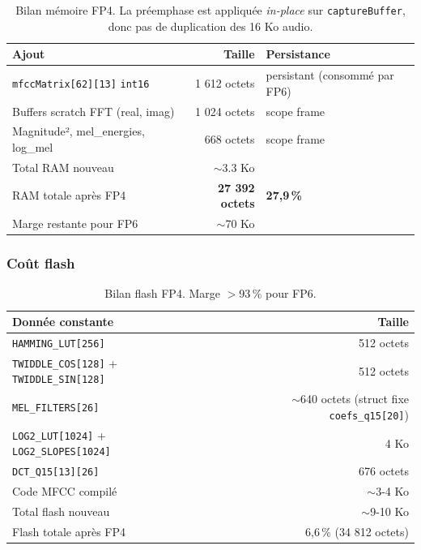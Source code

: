 \begin{table}[H]
\centering
\small
\begin{tabularx}{0.85\linewidth}{@{}l r X@{}}
\toprule
\textbf{Ajout} & \textbf{Taille} & \textbf{Persistance} \\
\midrule
\texttt{mfccMatrix[62][13]} \texttt{int16} & 1 612 octets  & persistant (consommé par FP6) \\
Buffers scratch FFT (real, imag) & 1 024 octets  & scope frame \\
Magnitude², mel\_energies, log\_mel & 668 octets    & scope frame \\
\midrule
Total RAM nouveau & $\sim$3.3 Ko & \\
RAM totale après FP4 & \textbf{27 392 octets} & \textbf{27,9\,\%} \\
Marge restante pour FP6 & $\sim$70 Ko & \\
\bottomrule
\end{tabularx}
\caption{Bilan mémoire FP4. La préemphase est appliquée \emph{in-place} sur \texttt{captureBuffer}, donc pas de duplication des 16 Ko audio.}
\end{table}

\subsubsection{Coût flash}

\begin{table}[H]
\centering
\small
\begin{tabularx}{0.85\linewidth}{@{}l r@{}}
\toprule
\textbf{Donnée constante} & \textbf{Taille} \\
\midrule
\texttt{HAMMING\_LUT[256]} & 512 octets \\
\texttt{TWIDDLE\_COS[128]} + \texttt{TWIDDLE\_SIN[128]} & 512 octets \\
\texttt{MEL\_FILTERS[26]} & $\sim$640 octets (struct fixe \texttt{coefs\_q15[20]}) \\
\texttt{LOG2\_LUT[1024]} + \texttt{LOG2\_SLOPES[1024]} & 4 Ko \\
\texttt{DCT\_Q15[13][26]} & 676 octets \\
Code MFCC compilé & $\sim$3-4 Ko \\
\midrule
Total flash nouveau & $\sim$9-10 Ko \\
Flash totale après FP4 & 6,6\,\% (34 812 octets) \\
\bottomrule
\end{tabularx}
\caption{Bilan flash FP4. Marge $>$93\,\% pour FP6.}
\end{table}

